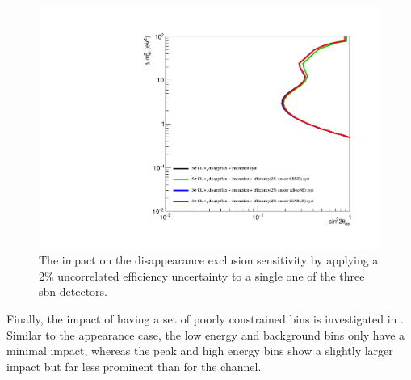 \begin{figure}[h!]
    \centering
    \includegraphics[width = \largefigwidth]{figures-chap6/exclusion_contours/efficiency_systematics/nue_disapp_2pct_uncor_per_detector.pdf}
    \caption[\nue disapp with a 2\% uncorrelated efficiency systematic for one detector only.]{The impact on the \nue disappearance exclusion sensitivity by applying a 2\% uncorrelated efficiency uncertainty to a single one of the three \gls{sbn} detectors.}
    \label{fig:nue_disapp_uncorrelated_per_detector}
\end{figure}

\newpage
Finally, the impact of having a set of poorly constrained bins is investigated in . Similar to the \nue appearance case, the low energy and background bins only have a minimal impact, whereas the peak and high energy bins show a slightly larger impact but far less prominent than for the \numu channel. 

